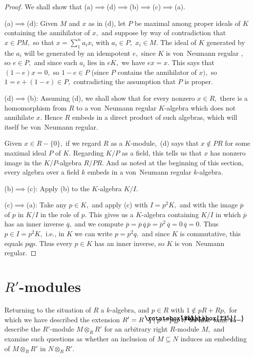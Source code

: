\documentclass{amsart}
\DeclareRobustCommand{\lang}{\begin{picture}(5,7)
\put(1.2,2.5){\rotatebox{45}{\line(1,0){6.0}}}
\put(1.2,2.5){\rotatebox{315}{\line(1,0){6.0}}}
\end{picture}\kern.16em}
\DeclareRobustCommand{\rang}{\kern.1em\begin{picture}(5,7)
\put(.1,2.5){\rotatebox{135}{\line(1,0){6.0}}}
\put(.1,2.5){\rotatebox{225}{\line(1,0){6.0}}}
\end{picture}}
\begin{document}
\begin{proof}
We shall show that
(a)$\implies$(d)$\implies$(b)$\implies$(c)$\implies$(a).

(a)$\implies$(d):
Given $M$ and $x$ as in (d),
let $P$ be maximal among proper ideals of $K$ containing the
annihilator of $x,$ and suppose by way of contradiction that
$x\in PM,$ so that $x=\sum_1^{n} a_i x_i$ with $a_i\in P,$ $x_i\in M.$
The ideal of $K$ generated by the $a_i$ will be generated
by an idempotent $e,$ since $K$ is von~Neumann
regular \cite[Theorem~1.1(a)$\!\implies\!$(b)]{KG},
so $e\in P,$ and since each $a_i$ lies in $eK,$ we have $ex=x.$
This says that $(1-e)x=0,$ so $1-e\in P$
(since $P$ contains the annihilator of $x),$ so $1=e+(1-e)\in P,$
contradicting the assumption that $P$ is proper.

(d)$\implies$(b):
Assuming (d), we shall show that for every nonzero $x\in R,$ there is a
homomorphism from $R$ to a von~Neumann regular $\!K\!$-algebra
which does not annihilate $x.$
Hence $R$ embeds in a direct product of such algebras,
which will itself be von~Neumann regular.

Given $x\in R-\{0\},$ if we regard $R$ as a $\!K\!$-module,~(d)
says that $x\notin PR$ for some maximal ideal $P$ of $K.$
Regarding $K/P$ as a field, this tells us that $x$ has nonzero
image in the $\!K/P\!$-algebra $R/PR.$
And as noted at the beginning of this section,
every algebra over a field $k$
embeds in a von~Neumann regular $\!k\!$-algebra.

(b)$\implies$(c):
Apply (b) to the $\!K\!$-algebra $K/I.$

(c)$\implies$(a):
Take any $p\in K,$ and apply (c) with $I=p^2 K,$
and with the image $\overline{p}$ of $p$ in $K/I$ in the role of $p.$
This gives us a $\!K\!$-algebra containing $K/I$ in which $\overline{p}$
has an inner inverse $\overline{q},$ and we compute $\overline{p}=
\overline{p}\,\overline{q}\,\overline{p}= \overline{p}^2\,\overline{q}=
0\,\overline{q}=0.$
Thus $p\in I=p^2 K,$ i.e., in $K$ we can write
$p=p^2 q,$ and since $K$ is commutative, this equals $pqp.$
Thus every $p\in K$ has an inner inverse, so $K$ is von~Neumann regular.
\end{proof}

\section{$R'\!$-modules}\label{S.modules}

Returning to the situation of $R$ a $\!k\!$-algebra, and
$p\in R$ with $1\notin pR+Rp,$ for which we have described the
extension $R'=R\lang q\mid p=pqp\rang,$
we now want to describe the $\!R'\!$-module $M\otimes_R R'$ for an
arbitrary right $\!R\!$-module $M,$ and examine such questions as
whether an inclusion of $M\subseteq N$ induces
an embedding of $M\otimes_R R'$ in $N\otimes_R R'.$
\end{document}
